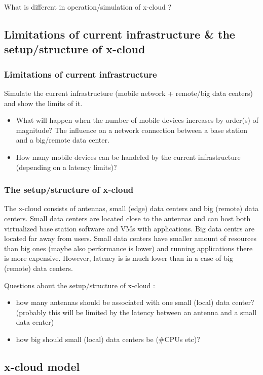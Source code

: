 \documentclass[conference]{IEEEtran}
\newcommand{\xcloud}{x-cloud }
\begin{document}
What is different in operation/simulation of \xcloud?

\subsection{Limitations of current infrastructure \& the setup/structure of \xcloud}
\subsubsection{Limitations of current infrastructure}
Simulate the current infrastructure (mobile network + remote/big data centers) and show the limits of it.
\begin{itemize}
\item What will happen when the number of mobile devices increases by order(s) of magnitude? The influence on a network connection between a base station and a big/remote data center.
\item How many mobile devices can be handeled by the current infrastructure (depending on a latency limits)?
\end{itemize}
\subsubsection{The setup/structure of \xcloud}
The \xcloud consists of antennas, small (edge) data centers and big (remote) data centers.
Small data centers are located close to the antennas and can host both virtualized base station software and VMs with applications.
Big data centrs are located far away from users.
Small data centers have smaller amount of resources than big ones (maybe also performance is lower) and running applications there is more expensive.
However, latency is is much lower than in a case of big (remote) data centers.

Questions about the setup/structure of \xcloud:
\begin{itemize}
\item how many antennas should be associated with one small (local) data center? (probably this will be limited by the latency between an antenna and a small data center)
\item how big should small (local) data centers be (\#CPUs etc)?
\end{itemize}

\subsection{\xcloud model}
\end{document}
